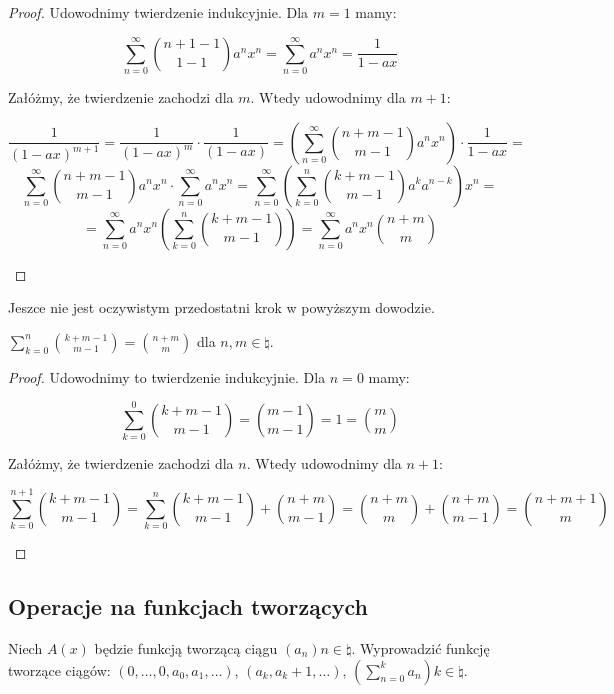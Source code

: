 \begin{proof}
    Udowodnimy twierdzenie indukcyjnie. Dla $m = 1$ mamy:

    $$ \sum_{n=0}^{\infty} \binom{n+1-1}{1-1} a^n x^n = \sum_{n=0}^{\infty} a^n x^n = \dfrac{1}{1-ax} $$

    Załóżmy, że twierdzenie zachodzi dla $m$. Wtedy udowodnimy dla $m+1$:

    \begin{multiline}
        $$ \frac{1}{(1-ax)^{m+1}} = \frac{1}{(1-ax)^m} \cdot \frac{1}{(1-ax)} = \left( \sum_{n=0}^{\infty} \binom{n+m-1}{m-1} a^n x^n \right) \cdot \frac{1}{1-ax} = $$
        $$ \sum_{n=0}^{\infty} \binom{n+m-1}{m-1} a^n x^n \cdot \sum_{n=0}^{\infty} a^n x^n = \sum_{n=0}^{\infty} \left(\sum_{k=0}^{n} \binom{k+m-1}{m-1} a^k a^{n-k}\right) x^n = $$
        $$ = \sum_{n=0}^{\infty} a^{n} x^n \left( \sum_{k=0}^{n} \binom{k+m-1}{m-1} \right) = \sum_{n=0}^{\infty} a^{n} x^n \binom{n+m}{m} $$
    \end{multiline}
\end{proof}

Jeszce nie jest oczywistym przedostatni krok w powyższym dowodzie.

\begin{lemma}
    \( \displaystyle \sum_{k=0}^{n} \binom{k+m-1}{m-1} = \binom{n+m}{m} \) dla \( n, m \in \natural \).
\end{lemma}

\begin{proof}
    Udowodnimy to twierdzenie indukcyjnie. Dla \( n = 0 \) mamy:

    $$ \sum_{k=0}^{0} \binom{k+m-1}{m-1} = \binom{m-1}{m-1} = 1 = \binom{m}{m} $$

    Załóżmy, że twierdzenie zachodzi dla \( n \). Wtedy udowodnimy dla \( n+1 \):

    \begin{multiline}
        $$ \sum_{k=0}^{n+1} \binom{k+m-1}{m-1} = \sum_{k=0}^{n} \binom{k+m-1}{m-1} + \binom{n+m}{m-1} = \binom{n+m}{m} + \binom{n+m}{m-1} = \binom{n+m+1}{m} $$
    \end{multiline}
\end{proof}


\subsection{Operacje na funkcjach tworzących}

Niech \(A(x)\) będzie funkcją tworzącą ciągu \((a_n) n \in \natural\).
Wyprowadzić funkcję tworzące ciągów: \((0, \ldots , 0, a_0, a_1, \ldots)\), \((a_k, a_k+1, \ldots)\), \((\sum_{n=0}^k a_n)k \in \natural\).

